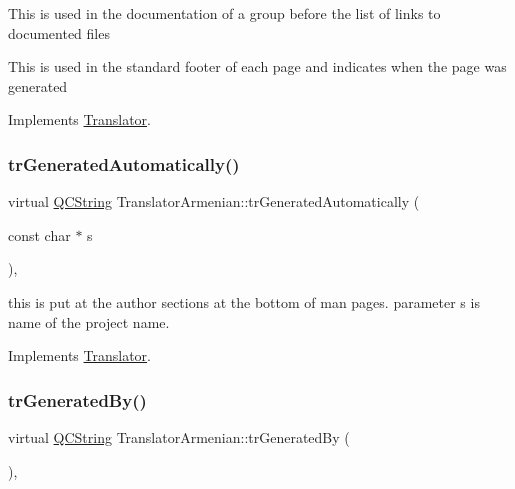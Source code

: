 This is used in the documentation of a group before the list of links to documented files

This is used in the standard footer of each page and indicates when the page was generated 

Implements \mbox{\hyperlink{class_translator}{Translator}}.

\mbox{\label{class_translator_armenian_a871ee85231b470a3cf0bb1d0b7909fa4}} 
\subsubsection{\texorpdfstring{trGeneratedAutomatically()}{trGeneratedAutomatically()}}
{\footnotesize\ttfamily virtual \mbox{\hyperlink{class_q_c_string}{Q\+C\+String}} Translator\+Armenian\+::tr\+Generated\+Automatically (\begin{DoxyParamCaption}\item[{const char $\ast$}]{s }\end{DoxyParamCaption})\hspace{0.3cm}{\ttfamily [inline]}, {\ttfamily [virtual]}}

this is put at the author sections at the bottom of man pages. parameter s is name of the project name. 

Implements \mbox{\hyperlink{class_translator}{Translator}}.

\mbox{\label{class_translator_armenian_a34b58a9f2a42188db0f960d03d904449}} 
\subsubsection{\texorpdfstring{trGeneratedBy()}{trGeneratedBy()}}
{\footnotesize\ttfamily virtual \mbox{\hyperlink{class_q_c_string}{Q\+C\+String}} Translator\+Armenian\+::tr\+Generated\+By (\begin{DoxyParamCaption}{ }\end{DoxyParamCaption})\hspace{0.3cm}{\ttfamily [inline]}, {\ttfamily [virtual]}}

